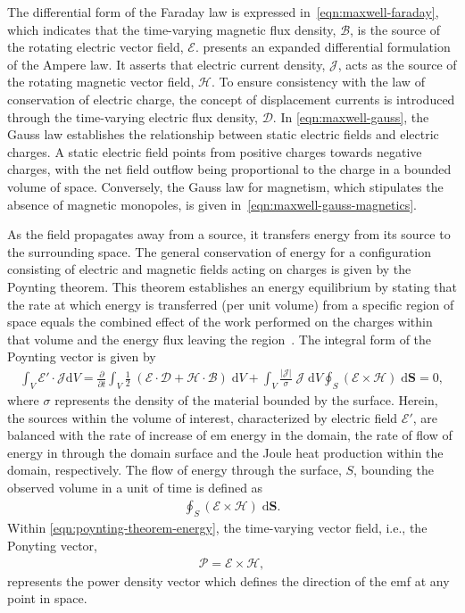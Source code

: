 The differential form of the Faraday law is expressed in~\cref{eqn:maxwell-faraday}, which indicates that the time-varying magnetic flux density, $\mathcal{B}$, is the source of the rotating electric vector field, $\mathcal{E}$.
 presents an expanded differential formulation of the Ampere law.
It asserts that electric current density, $\mathcal{J}$, acts as the source of the rotating magnetic vector field, $\mathcal{H}$.
To ensure consistency with the law of conservation of electric charge, the concept of displacement currents is introduced through the time-varying electric flux density, $\mathcal{D}$.
In \cref{eqn:maxwell-gauss}, the Gauss law establishes the relationship between static electric fields and electric charges. A static electric field points from positive charges towards negative charges, with the net field outflow being proportional to the charge in a bounded volume of space.
Conversely, the Gauss law for magnetism, which stipulates the absence of magnetic monopoles, is given in~\cref{eqn:maxwell-gauss-magnetics}.

As the field propagates away from a source, it transfers energy from its source to the surrounding space.
The general conservation of energy for a configuration consisting of electric and magnetic fields acting on charges is given by the Poynting theorem.
This theorem establishes an energy equilibrium by stating that the rate at which energy is transferred (per unit volume) from a specific region of space equals the combined effect of the work performed on the charges within that volume and the energy flux leaving the region~\cite{Jackson1998Classical}.
The integral form of the Poynting vector is given by
\begin{align}
    \label{eqn:poynting-theorem}
    \int_{V} \mathcal{E}' \cdot \mathcal{J} \mathrm{d}V = \frac{\partial}{\partial t}\int_V \frac{1}{2} \; \left( \mathcal{E} \cdot \mathcal{D} + \mathcal{H} \cdot \mathcal{B} \right) \; \mathrm{d}V + \int_{V} \frac{\left| \mathcal{J} \right|}{\sigma} \; \mathcal{J} \; \mathrm{d}V \oint_S \left( \mathcal{E} \times \mathcal{H} \right) \; \mathrm{d} \mathbf{S} = 0,
\end{align}
where $\sigma$ represents the density of the material bounded by the surface.
Herein, the sources within the volume of interest, characterized by electric field $\mathcal{E}'$, are balanced with the rate of increase of \gls{em} energy in the domain, the rate of flow of energy in through the domain surface and the Joule heat production within the domain, respectively.
The flow of energy through the surface, $S$, bounding the observed volume in a unit of time is defined as
\begin{align}
    \label{eqn:poynting-theorem-energy}
    \oint_S \left( \mathcal{E} \times \mathcal{H} \right) \; \mathrm{d} \mathbf{S}.
\end{align}
Within \cref{eqn:poynting-theorem-energy}, the time-varying vector field, i.e., the Ponyting vector,
\begin{align}
    \label{eqn:poynting-vector}
    \mathcal{P} = \mathcal{E} \times \mathcal{H},
\end{align}
represents the power density vector which defines the direction of the \gls{emf} at any point in space.

